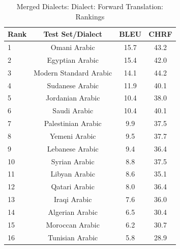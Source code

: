 \begin{table}[htbp]
\centering
\caption{Merged Dialects: Dialect: Forward Translation: Rankings}
\label{tab:testset_ranking_forward_merged_dialect}
\begin{tabular}{l@{\hspace{3pt}}c@{\hspace{3pt}}c@{\hspace{3pt}}c}
\toprule
Rank & Test Set/Dialect & BLEU & CHRF \\
\midrule
1 & Omani Arabic & 15.7 & 43.2 \\
2 & Egyptian Arabic & 15.4 & 42.0 \\
3 & Modern Standard Arabic & 14.1 & 44.2 \\
4 & Sudanese Arabic & 11.9 & 40.1 \\
5 & Jordanian Arabic & 10.4 & 38.0 \\
6 & Saudi Arabic & 10.4 & 40.1 \\
7 & Palestinian Arabic & 9.9 & 37.5 \\
8 & Yemeni Arabic & 9.5 & 37.7 \\
9 & Lebanese Arabic & 9.4 & 36.4 \\
10 & Syrian Arabic & 8.8 & 37.5 \\
11 & Libyan Arabic & 8.6 & 35.1 \\
12 & Qatari Arabic & 8.0 & 36.4 \\
13 & Iraqi Arabic & 7.6 & 36.0 \\
14 & Algerian Arabic & 6.5 & 30.4 \\
15 & Moroccan Arabic & 6.2 & 30.7 \\
16 & Tunisian Arabic & 5.8 & 28.9 \\
\bottomrule
\end{tabular}
\end{table}